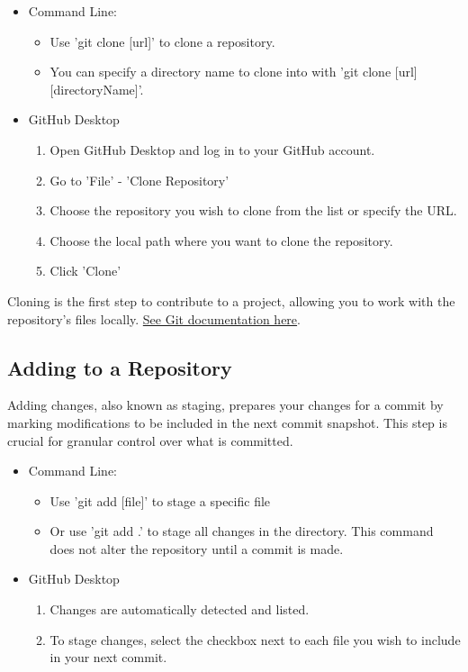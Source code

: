 \documentclass[10pt,twocolumn]{article}
\begin{document}
\begin{itemize}
    \item Command Line: 
    \begin{itemize}
        \item Use 'git clone [url]' to clone a repository. 
        \item You can specify a directory name to clone into with 'git clone [url] [directoryName]'.
    \end{itemize}
    \item GitHub Desktop
    \begin{enumerate}
        \item Open GitHub Desktop and log in to your GitHub account.
        \item Go to 'File' - 'Clone Repository'
        \item Choose the repository you wish to clone from the list or specify the URL.
        \item Choose the local path where you want to clone the repository.
        \item Click 'Clone'
    \end{enumerate}
    
\end{itemize}

Cloning is the first step to contribute to a project, allowing you to work with the repository's files locally. \hyperlink{https://git-scm.com/docs/git-clone}{See Git documentation here}. \cite{GitCloneDocumentation}\cite{GitGuidesClone}

\subsection{Adding to a Repository}
Adding changes, also known as staging, prepares your changes for a commit by marking modifications to be included in the next commit snapshot. This step is crucial for granular control over what is committed.

\begin{itemize}
    \item Command Line: 
    \begin{itemize}
        \item  Use 'git add [file]' to stage a specific file 
        \item Or use 'git add .' to stage all changes in the directory. This command does not alter the repository until a commit is made.
    \end{itemize}
    \item GitHub Desktop
    \begin{enumerate}
        \item Changes are automatically detected and listed.
        \item To stage changes, select the checkbox next to each file you wish to include in your next commit.
    \end{enumerate}
    
\end{itemize}
\end{document}
